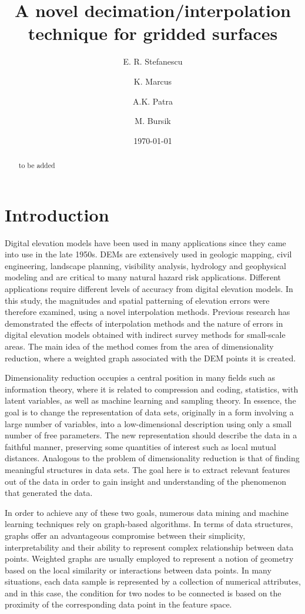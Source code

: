 \documentclass[12pt,letterpaper]{article}
\title{A novel decimation/interpolation technique for gridded surfaces}
\author[1]{ E. R. Stefanescu}
\author[2]{K. Marcus}
\author[1]{A.K. Patra}
\author[3]{M. Bursik}
\affil[1]{Department of Mechanical and Aerospace Engineering, University at Buffalo, Buffalo, NY 14260}
\affil[2]{Department of Computer Science and Engineering, University at Buffalo, Buffalo, NY 14260 }
\affil[3]{Department of Geology, University at Buffalo, Buffalo, NY 14260 }
\date{\today}
\begin{document}
\linenumbers
\maketitle

\begin{abstract}
to be added
\end{abstract}

\section{Introduction}
Digital elevation models have been used in many applications since they came into use in the late 1950s. DEMs are extensively used in geologic mapping, civil engineering, landscape planning, visibility analysis, hydrology and geophysical modeling and are critical to many natural hazard risk applications.
Different applications require different levels of accuracy from digital elevation models. In this study, the magnitudes and spatial patterning of elevation errors were therefore examined, using a novel interpolation methods. Previous research has demonstrated the effects of interpolation methods and the nature of errors in digital elevation models obtained with indirect survey methods for small-scale areas. The main idea of the method comes from the area of dimensionality reduction, where a weighted graph associated with the DEM points it is created.

Dimensionality reduction occupies a central position in many fields such as information theory, where it is related to compression and coding, statistics, with latent variables, as well as machine learning and sampling theory. In essence, the goal is to change the representation of data sets, originally in a form involving a large number of variables, into a low-dimensional description using only a small number of free parameters. The new representation should describe the data in a faithful manner, preserving some quantities of interest such as local mutual distances. Analogous to the problem of dimensionality reduction is that of finding meaningful structures in data sets. The goal here is to extract relevant features out of the data in order to gain insight and understanding of the phenomenon that generated the data.

In order to achieve any of these two goals, numerous data mining and machine learning techniques rely on graph-based algorithms. In terms of data structures, graphs offer an advantageous compromise between their simplicity, interpretability and their ability to represent complex relationship between data points. Weighted graphs are usually employed to represent a notion of geometry based on the local similarity or interactions between data points. In many situations, each data sample is represented by a collection of numerical attributes, and in this case, the condition for two nodes to be connected is based on the proximity of the corresponding data point in the feature space.
\end{document}
